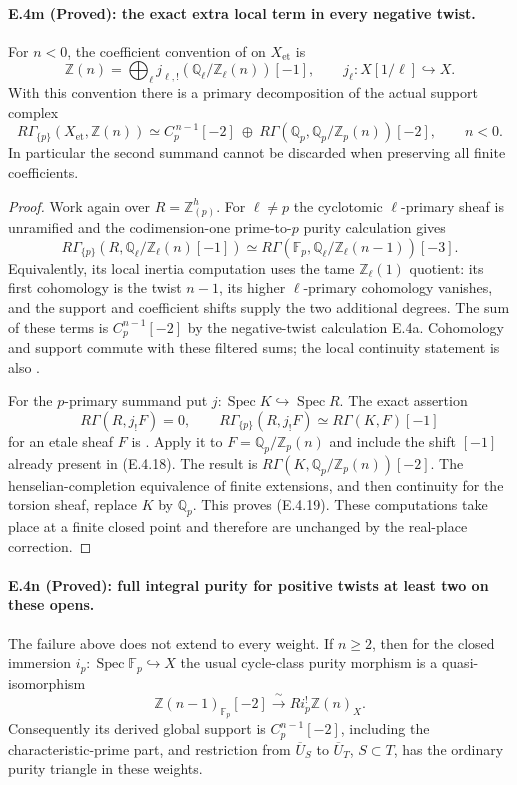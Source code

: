 \paragraph{E.4m (Proved): the exact extra local term in every negative twist.}
For $n<0$, the coefficient convention of
\citet[\S3.1 and \S6.2]{D_FlachMorin2018} on $X_{\mathrm{et}}$ is
\[
 \mathbb Z(n)=
   \bigoplus_\ell j_{\ell,!}(\mathbb Q_\ell/\mathbb Z_\ell(n))[-1],
 \qquad j_\ell:X[1/\ell]\hookrightarrow X.
 \tag{E.4.18}
\]
With this convention there is a primary decomposition of the
actual support complex
\[
 R\Gamma_{\{p\}}(X_{\mathrm{et}},\mathbb Z(n))
 \simeq
 C_p^{\,n-1}[-2]\ \oplus\
 R\Gamma(\mathbb Q_p,\mathbb Q_p/\mathbb Z_p(n))[-2],
 \qquad n<0.
 \tag{E.4.19}
\]
In particular the second summand cannot be discarded when
preserving all finite coefficients.

\begin{proof}
Work again over $R=\mathbb Z_{(p)}^h$. For $\ell\ne p$ the
cyclotomic $\ell$-primary sheaf is unramified and the codimension-one
prime-to-$p$ purity calculation gives
\[
 R\Gamma_{\{p\}}(R,\mathbb Q_\ell/\mathbb Z_\ell(n)[-1])
  \simeq
 R\Gamma(\mathbb F_p,\mathbb Q_\ell/\mathbb Z_\ell(n-1))[-3].
\]
Equivalently, its local inertia computation uses the tame
$\mathbb Z_\ell(1)$ quotient: its first cohomology is the twist
$n-1$, its higher $\ell$-primary cohomology vanishes, and the
support and coefficient shifts supply the two additional degrees.
The sum of these terms is $C_p^{n-1}[-2]$ by the
negative-twist calculation E.4a. Cohomology and support commute
with these filtered sums; the local continuity statement is also
\citet[Lemma 2.1]{D_GeisserDedekind2004}.

For the $p$-primary summand put
$j:\operatorname{Spec}K\hookrightarrow\operatorname{Spec}R$.
The exact assertion
\[
 R\Gamma(R,j_!F)=0,\qquad
 R\Gamma_{\{p\}}(R,j_!F)\simeq R\Gamma(K,F)[-1]
\]
for an etale sheaf $F$ is
\citet[II, Proposition 1.1(a)]{D_MilneADT2006}.
Apply it to $F=\mathbb Q_p/\mathbb Z_p(n)$ and include the
shift $[-1]$ already present in (E.4.18). The result is
$R\Gamma(K,\mathbb Q_p/\mathbb Z_p(n))[-2]$.
The henselian-completion equivalence of finite extensions,
and then continuity for the torsion sheaf, replace $K$ by
$\mathbb Q_p$. This proves (E.4.19).
These computations take place at a finite closed point and
therefore are unchanged by the real-place correction.
\end{proof}

\paragraph{E.4n (Proved): full integral purity for positive twists at least two on these opens.}
The failure above does not extend to every weight. If $n\ge2$,
then for the closed immersion $i_p:\operatorname{Spec}\mathbb F_p
\hookrightarrow X$ the usual cycle-class purity morphism is a
quasi-isomorphism
\[
 \mathbb Z(n-1)_{\mathbb F_p}[-2]
       \xrightarrow{\ \sim\ } Ri_p^!\mathbb Z(n)_X.
 \tag{E.4.20}
\]
Consequently its derived global support is $C_p^{n-1}[-2]$,
including the characteristic-prime part, and restriction from
$\overline U_S$ to $\overline U_T$, $S\subset T$, has the
ordinary purity triangle in these weights.

